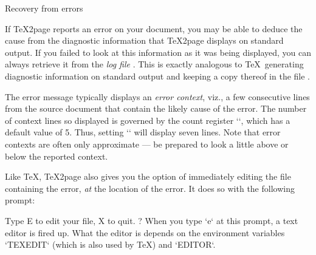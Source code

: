 {{{{{{{{{%

 Recovery from errors

%
If \TeX2page reports an error on your document, you may
be able to deduce the cause from the diagnostic
information that \TeX2page displays  on standard
output.  If you failed to look at this information as
it was being displayed, you can always retrieve it from
the {\em log file} .  This is
exactly analogous to \TeX\ generating diagnostic
information on standard output and keeping a copy
thereof in the file .


The  error message typically displays an {\em error
context}, viz., a few consecutive lines from the source
document that contain the likely cause of the error.
The number of context lines so displayed is governed by
the count register `\errorcontextlines`, which has a default
value of 5.  Thus, setting `` will display
seven lines.  Note that error contexts are often
only approximate — be prepared to look a little above
or below the reported context.


Like \TeX, \TeX2page also gives you the option of immediately
editing the file containing the error,
{\em at} the location of the error.  It does so with the
following prompt:

\begintt
Type E to edit your file, X to quit.
?
\endtt
%
When you type `e` at this prompt, a text editor
is fired up.  What the editor is depends on the
environment variables `TEXEDIT` (which is also used
by \TeX) and `EDITOR`.

}}}}}}}}}
